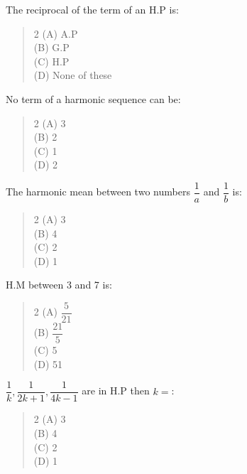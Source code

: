 \documentclass[11pt,a4paper]{article}
\begin{document}
\begin{mcqlist}
\item The reciprocal of the term of an H.P is:
\begin{quote}\begin{multicols}{2}
\noindent (A) A.P \\
(B) G.P \\
(C) H.P \\
(D) None of these
\end{multicols}\end{quote}

\item No term of a harmonic sequence can be:
\begin{quote}\begin{multicols}{2}
\noindent (A) 3 \\
(B) 2 \\
(C) 1 \\
(D) 2
\end{multicols}\end{quote}

\item The harmonic mean between two numbers $\dfrac{1}{a}$ and $\dfrac{1}{b}$ is:
\begin{quote}\begin{multicols}{2}
\noindent (A) 3 \\
(B) 4 \\
(C) 2 \\
(D) 1
\end{multicols}\end{quote}

\item H.M between 3 and 7 is:
\begin{quote}\begin{multicols}{2}
\noindent (A) $\dfrac{5}{21}$ \\
(B) $\dfrac{21}{5}$ \\
(C) 5 \\
(D) 51
\end{multicols}\end{quote}

\item $\dfrac{1}{k},\dfrac{1}{2k+1},\dfrac{1}{4k-1}$ are in H.P then $k=$:
\begin{quote}\begin{multicols}{2}
\noindent (A) 3 \\
(B) 4 \\
(C) 2 \\
(D) 1
\end{multicols}\end{quote}


\end{mcqlist}
\end{document}
